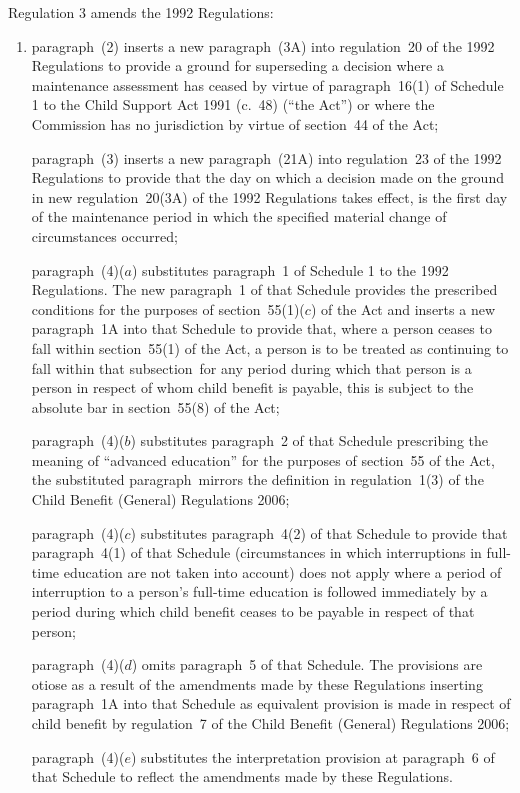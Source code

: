 \documentclass[12pt,a4paper]{article}
\begin{document}
Regulation 3 amends the 1992 Regulations:
\begin{enumerate}\item[]
    paragraph~(2) inserts a new paragraph~(3A) into regulation~20 of the 1992 Regulations to provide a ground for superseding a decision where a maintenance assessment has ceased by virtue of paragraph~16(1) of Schedule 1 to the Child Support Act 1991 (c.~48) (“the Act”) or where the Commission has no jurisdiction by virtue of section~44 of the Act;

    paragraph~(3) inserts a new paragraph~(21A) into regulation~23 of the 1992 Regulations to provide that the day on which a decision made on the ground in new regulation~20(3A) of the 1992 Regulations takes effect, is the first day of the maintenance period in which the specified material change of circumstances occurred;

    paragraph~(4)($a$)  substitutes paragraph~1 of Schedule 1 to the 1992 Regulations. The new paragraph~1 of that Schedule provides the prescribed conditions for the purposes of section~55(1)($c$)  of the Act and inserts a new paragraph~1A into that Schedule to provide that, where a person ceases to fall within section~55(1) of the Act, a person is to be treated as continuing to fall within that subsection~for any period during which that person is a person in respect of whom child benefit is payable, this is subject to the absolute bar in section~55(8) of the Act;

    paragraph~(4)($b$)  substitutes paragraph~2 of that Schedule prescribing the meaning of “advanced education” for the purposes of section~55 of the Act, the substituted paragraph~mirrors the definition in regulation~1(3) of the Child Benefit (General) Regulations 2006;

    paragraph~(4)($c$)  substitutes paragraph~4(2) of that Schedule to provide that paragraph~4(1) of that Schedule (circumstances in which interruptions in full-time education are not taken into account) does not apply where a period of interruption to a person’s full-time education is followed immediately by a period during which child benefit ceases to be payable in respect of that person;

    paragraph~(4)($d$)  omits paragraph~5 of that Schedule. The provisions are otiose as a result of the amendments made by these Regulations inserting paragraph~1A into that Schedule as equivalent provision is made in respect of child benefit by regulation~7 of the Child Benefit (General) Regulations 2006;

    paragraph~(4)($e$)  substitutes the interpretation provision at paragraph~6 of that Schedule to reflect the amendments made by these Regulations. 
\end{enumerate}
\end{document}
